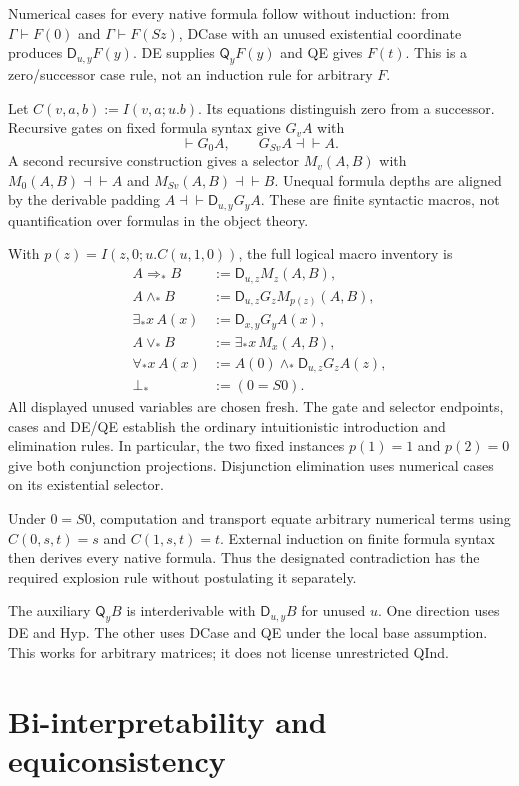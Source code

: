 \documentclass[11pt,letterpaper]{article}
\theoremstyle{definition}\newtheorem{definition}[theorem]{Definition}
\theoremstyle{remark}\newtheorem{remark}[theorem]{Remark}
\newcommand{\D}{\mathsf D}
\newcommand{\Q}{\mathsf Q}
\begin{document}
Numerical cases for every native formula follow without induction:
from $\Gamma\vdash F(0)$ and $\Gamma\vdash F(Sz)$, DCase with an
unused existential coordinate produces $\D_{u,y}F(y)$. DE supplies
$\Q_yF(y)$ and QE gives $F(t)$. This is a zero/successor case rule,
not an induction rule for arbitrary $F$.

Let $C(v,a,b):=I(v,a;u.b)$. Its equations distinguish zero from a
successor. Recursive gates on fixed formula syntax give $G_vA$ with
\[
                  \vdash G_0A,\qquad G_{Sv}A\dashv\vdash A.
\]
A second recursive construction gives a selector $M_v(A,B)$ with
$M_0(A,B)\dashv\vdash A$ and $M_{Sv}(A,B)\dashv\vdash B$.
Unequal formula depths are aligned by the derivable padding
$A\dashv\vdash\D_{u,y}G_yA$. These are finite syntactic macros,
not quantification over formulas in the object theory.

With $p(z)=I(z,0;u.C(u,1,0))$, the full logical macro inventory is
\begin{align*}
 A\Rightarrow_* B&:=\D_{u,z}M_z(A,B),\\
 A\wedge_* B&:=\D_{u,z}G_zM_{p(z)}(A,B),\\
 \exists_*x\,A(x)&:=\D_{x,y}G_yA(x),\\
 A\vee_* B&:=\exists_*x\,M_x(A,B),\\
 \forall_*x\,A(x)&:=A(0)\wedge_*\D_{u,z}G_zA(z),\\
 \bot_*&:=(0=S0).
\end{align*}
All displayed unused variables are chosen fresh. The gate and selector
endpoints, cases and DE/QE establish the ordinary intuitionistic
introduction and elimination rules. In particular, the two fixed
instances $p(1)=1$ and $p(2)=0$ give both conjunction projections.
Disjunction elimination uses numerical cases on its existential selector.

Under $0=S0$, computation and transport equate arbitrary numerical
terms using $C(0,s,t)=s$ and $C(1,s,t)=t$. External induction on
finite formula syntax then derives every native formula. Thus the
designated contradiction has the required explosion rule without
postulating it separately.

The auxiliary $\Q_yB$ is interderivable with $\D_{u,y}B$ for unused
$u$. One direction uses DE and Hyp. The other uses DCase and QE under
the local base assumption. This works for arbitrary matrices; it does
not license unrestricted QInd.

\section{Bi-interpretability and equiconsistency}
\end{document}
